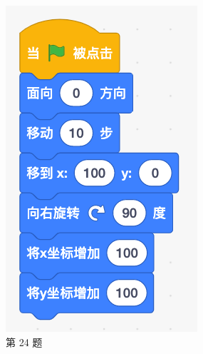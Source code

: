 \documentclass[10pt, a4paper]{article}
\begin{document}
    \begin{figure}[htbp]
        \centering
        \begin{minipage}[t]{.15\textwidth}
            \centering
            \includegraphics[width=\textwidth]{24.png}
            \caption*{第 24 题}
        \end{minipage}
        \begin{minipage}[t]{.14\textwidth}
            \centering

\end{minipage}
\end{figure}
\end{document}
